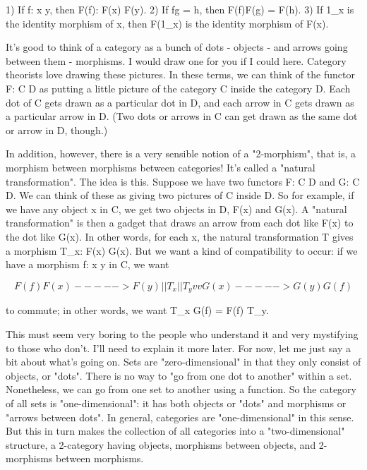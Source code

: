 1) If f: x \to  y, then F(f): F(x) \to  F(y).
2) If fg = h, then F(f)F(g) = F(h). 
3) If 1_{x} is the identity morphism of x, then F(1_{x}) is the identity
   morphism of F(x). 

It's good to think of a category as a bunch of dots - objects - and
arrows going between them - morphisms.  I would draw one for you if I
could here.  Category theorists love drawing these pictures.  In these
terms, we can think of the functor F: C \to  D as putting a little picture
of the category C inside the category D.  Each dot of C gets drawn as a
particular dot in D, and each arrow in C gets drawn as a particular
arrow in D.  (Two dots or arrows in C can get drawn as the same dot or
arrow in D, though.)  


In addition, however, there is a very sensible notion of a
"2-morphism", that is, a morphism between morphisms between
categories!  It's called a "natural transformation".  The idea
is this.  Suppose we have two functors F: C \to  D and G: C \to  D.
We can think of these as giving two pictures of C inside D.  So for
example, if we have any object x in C, we get two objects in D, F(x) and
G(x).  A "natural transformation" is then a gadget that draws
an arrow from each dot like F(x) to the dot like G(x).  In other words,
for each x, the natural transformation T gives a morphism T_{x}:
F(x) \to  G(x).  But we want a kind of compatibility to occur: if we
have a morphism f: x \to  y in C, we want


$$

                               F(f)
                         F(x) -----> F(y)
                      _{ }   |           |
                        T_{x}|           |T_{y}
                          v           v
                         G(x) -----> G(y)
                               G(f)

$$
    
to commute; in other words, we want T_{x} G(f) = F(f) T_{y}.  

This must seem very boring to the people who understand it and very
mystifying to those who don't.  I'll need to explain it more later.  For
now, let me just say a bit about what's going on.  Sets are
"zero-dimensional" in that they only consist of objects, or
"dots".  There is no way to "go from one dot to
another" within a set.  Nonetheless, we can go from one set to
another using a function.  So the category of all sets is
"one-dimensional": it has both objects or "dots" and
morphisms or "arrows between dots".  In general, categories
are "one-dimensional" in this sense.  But this in turn makes
the collection of all categories into a "two-dimensional"
structure, a 2-category having objects, morphisms between objects, and
2-morphisms between morphisms.  

